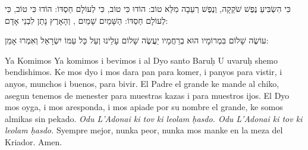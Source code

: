 כִּי הִשְׂבִּיעַ נֶפֶשׁ שֹׁקֵקָה, וְנֶפֶשׁ רְעֵבָה מִלֵּא טוֹב: הוֹדוּ  כִּי טוֹב, כִּי לְעוֹלָם חַסְדּוֹ: הוֹדוּ  כִּי טוֹב, כִּי לְעוֹלָם חַסְדּוֹ: הַשָּׁמַיִם שָׁמַיִם , וְהָאָרֶץ נָתַן לִבְנֵי אָדָם:

עוֹשֶׂה שָׁלוֹם בִּמְרוֹמָיו הוּא בְרַחֲמָיו יַעֲשֶׂה שָׁלוֹם עָלֵינוּ וְעַל כָּל עַמּוֹ יִשְׂרָאֵל וְאִמְרוּ אָמֵן:

\begin{textbox}{Ya Komimos}
Ya komimos i bevimos i al Dyo santo Baruḥ U uvaruḥ shemo bendishimos.
Ke mos dyo i mos dara pan para komer, i panyos para vistir, i anyos, munchos
i buenos, para bivir. El Padre el grande ke mande al chiko, asegun tenemos de
menester para muestras kazas i para muestros ijos. El Dyo mos oyga, i mos
aresponda, i mos apiade por su nombre el grande, ke somos almikas sin pekado.
\textit{Odu L’Adonai ki tov ki leolam ḥasdo. Odu L’Adonai ki tov ki leolam
ḥasdo.} Syempre mejor, nunka peor, nunka mos manke en la meza del Kriador.
Amen.
\end{textbox}
